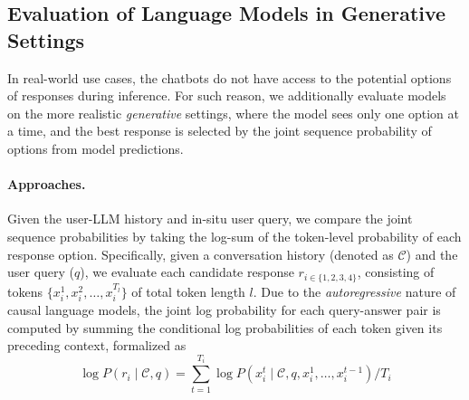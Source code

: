 
\subsection{Evaluation of Language Models in Generative Settings}
\label{ssec:geneartive}
In real-world use cases, the chatbots do not have access to the potential options of responses during inference. For such reason, we additionally evaluate models on the more realistic \emph{generative} settings, where the model sees only one option at a time, and the best response is selected by the joint sequence probability of options from model predictions.    



\paragraph{Approaches.} 
Given the user-LLM history and in-situ user query, we compare the joint sequence probabilities by taking the log-sum of the token-level probability of each response option. 
Specifically, given a conversation history (denoted as \( \mathcal{C} \)) and the user query (\( q \)), we evaluate each candidate response $r_{i \in \{1, 2, 3, 4\}}$, consisting of tokens \( \{x_i^1, x_i^2, \dots, x_i^{T_l}\} \) of total token length $l$. Due to the \textit{autoregressive} nature of causal language models, the joint log probability for each query-answer pair is computed by summing the conditional log probabilities of each token given its preceding context, formalized as 
\vspace{-1mm}
\[
\log P(r_i \mid \mathcal{C}, q) = \sum_{t=1}^{T_i} \log P(x_i^t \mid \mathcal{C}, q, x_i^1, \dots, x_i^{t-1})/T_i
\]
\vspace{-3mm}

